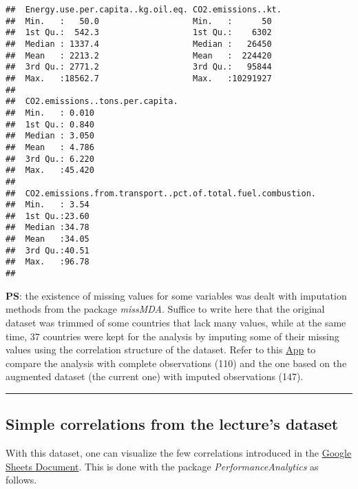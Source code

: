 \documentclass[]{article}
\begin{document}
\begin{verbatim}
##  Energy.use.per.capita..kg.oil.eq. CO2.emissions..kt.
##  Min.   :   50.0                   Min.   :      50  
##  1st Qu.:  542.3                   1st Qu.:    6302  
##  Median : 1337.4                   Median :   26450  
##  Mean   : 2213.2                   Mean   :  224420  
##  3rd Qu.: 2771.2                   3rd Qu.:   95844  
##  Max.   :18562.7                   Max.   :10291927  
##                                                      
##  CO2.emissions..tons.per.capita.
##  Min.   : 0.010                 
##  1st Qu.: 0.840                 
##  Median : 3.050                 
##  Mean   : 4.786                 
##  3rd Qu.: 6.220                 
##  Max.   :45.420                 
##                                 
##  CO2.emissions.from.transport..pct.of.total.fuel.combustion.
##  Min.   : 3.54                                              
##  1st Qu.:23.60                                              
##  Median :34.78                                              
##  Mean   :34.05                                              
##  3rd Qu.:40.51                                              
##  Max.   :96.78                                              
## 
\end{verbatim}

\textbf{PS}: the existence of missing values for some variables was
dealt with imputation methods from the package \emph{missMDA}. Suffice
to write here that the original dataset was trimmed of some countries
that lack many values, while at the same time, 37 countries were kept
for the analysis by imputing some of their missing values using the
correlation structure of the dataset. Refer to this
\href{https://arcg.is/uW4Ky}{App} to compare the analysis with complete
observations (110) and the one based on the augmented dataset (the
current one) with imputed observations (147).

\begin{center}\rule{0.5\linewidth}{\linethickness}\end{center}

\subsection{Simple correlations from the lecture's
dataset}\label{simple-correlations-from-the-lectures-dataset}

With this dataset, one can visualize the few correlations introduced in
the
\href{https://docs.google.com/spreadsheets/d/1NZpys5yniDyOuUPxV7JKWkcTP-FUZL1esZSvUitZPd0/edit?usp=sharing}{Google
Sheets Document}. This is done with the package
\emph{PerformanceAnalytics} as follows.
\end{document}
